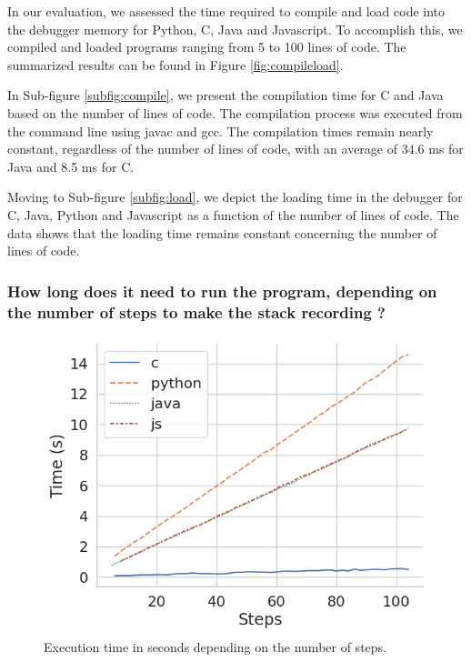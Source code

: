\documentclass[english,submission]{programming}
\begin{document}
In our evaluation, we assessed the time required to compile and load code into the debugger memory for Python, C, Java and Javascript. 
To accomplish this, we compiled and loaded programs ranging from 5 to 100 lines of code. 
The summarized results can be found in Figure \ref{fig:compileload}.

In Sub-figure \ref{subfig:compile}, we present the compilation time for C and Java based on the number of lines of code. 
The compilation process was executed from the command line using javac and gcc. 
The compilation times remain nearly constant, regardless of the number of lines of code, with an average of 34.6 ms for Java and 8.5 ms for C.

Moving to Sub-figure \ref{subfig:load}, we depict the loading time in the debugger for C, Java, Python and Javascript as a function of the number of lines of code. 
The data shows that the loading time remains constant concerning the number of lines of code. 

\subsubsection{How long does it need to run the program, depending on the number of steps to make the stack recording ?}

\begin{figure}[htbp]
  \centering
  \includegraphics[width=\textwidth]{img/execute.png}
  \caption{Execution time in seconds depending on the number of steps.}
  \label{fig:execute-time}
\end{figure}
\end{document}
